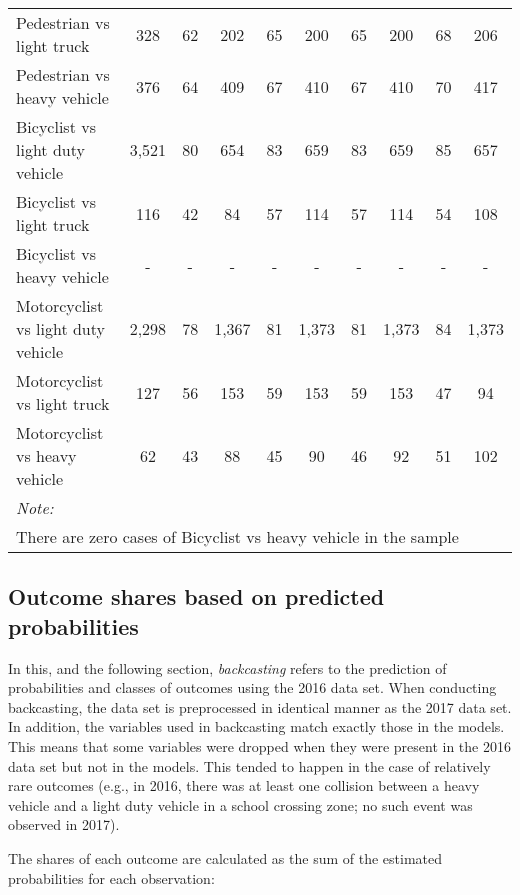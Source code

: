 \documentclass[]{elsarticle} %
\begin{document}
\begin{landscape}
\begin{table}
{\begin{tabular}[t]{lccccccccc}
\addlinespace
\rowcolor{gray!6}  Pedestrian vs light truck & 328 & 62 & 202 & 65 & 200 & 65 & 200 & 68 & 206\\
Pedestrian vs heavy vehicle & 376 & 64 & 409 & 67 & 410 & 67 & 410 & 70 & 417\\
\rowcolor{gray!6}  Bicyclist vs light duty vehicle & 3,521 & 80 & 654 & 83 & 659 & 83 & 659 & 85 & 657\\
Bicyclist vs light truck & 116 & 42 & 84 & 57 & 114 & 57 & 114 & 54 & 108\\
\rowcolor{gray!6}  Bicyclist vs heavy vehicle & - & - & - & - & - & - & - & - & -\\
\addlinespace
Motorcyclist vs light duty vehicle & 2,298 & 78 & 1,367 & 81 & 1,373 & 81 & 1,373 & 84 & 1,373\\
\rowcolor{gray!6}  Motorcyclist vs light truck & 127 & 56 & 153 & 59 & 153 & 59 & 153 & 47 & 94\\
Motorcyclist vs heavy vehicle & 62 & 43 & 88 & 45 & 90 & 46 & 92 & 51 & 102\\
\bottomrule
\multicolumn{10}{l}{\textit{Note: }}\\
\multicolumn{10}{l}{There are zero cases of Bicyclist vs heavy vehicle in the sample}\\
\end{tabular}}
\end{table}
\end{landscape}

\hypertarget{sec:outcomes-shares}{%
\subsection{Outcome shares based on predicted
probabilities}\label{sec:outcomes-shares}}

In this, and the following section, \emph{backcasting} refers to the
prediction of probabilities and classes of outcomes using the 2016 data
set. When conducting backcasting, the data set is preprocessed in
identical manner as the 2017 data set. In addition, the variables used
in backcasting match exactly those in the models. This means that some
variables were dropped when they were present in the 2016 data set but
not in the models. This tended to happen in the case of relatively rare
outcomes (e.g., in 2016, there was at least one collision between a
heavy vehicle and a light duty vehicle in a school crossing zone; no
such event was observed in 2017).

The shares of each outcome are calculated as the sum of the estimated
probabilities for each observation:
\end{document}
